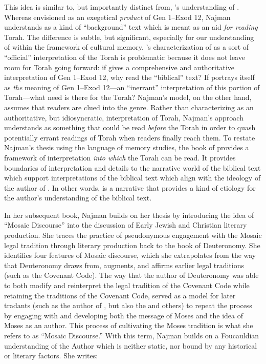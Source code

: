 This idea is similar to, but importantly distinct from, \vanderkam's understanding of \jub. Whereas \vanderkam envisioned \jub as an exegetical \emph{product} of Gen 1--Exod 12, Najman understands \jub as a kind of ``background'' text which is meant as an aid \emph{for reading} Torah. The difference is subtle, but significant, especially for our understanding of \jub within the framework of cultural memory. \vanderkam's characterization of \jub as a sort of ``official'' interpretation of the Torah is problematic because it does not leave room for Torah going forward: if \jub gives a comprehensive and authoritative interpretation of Gen 1--Exod 12, why read the ``biblical'' text? If \jub portrays itself as \emph{the} meaning of Gen 1--Exod 12---an ``inerrant'' interpretation of this portion of Torah---what need is there for the Torah? Najman's model, on the other hand, assumes that readers are clued into the genre. Rather than  characterizing \jub as an authoritative, but idiosyncratic, interpretation of Torah, Najman's approach understands \jub as something that could be read \emph{before} the Torah in order to quash potentially errant readings of Torah when readers finally reach them.%
    \autocite[408]{najman_jsj1999} 
To restate Najman's thesis using the language of memory studies, the book of \jub provides a framework of interpretation \emph{into which} the Torah can be read. It provides boundaries of interpretation and details to the narrative world of the biblical text which support interpretations of the biblical text which align with the ideology of the author of \jub. In other words, \jub is a narrative that provides a kind of etiology for the author's understanding of the biblical text. 

In her subsequent book, Najman builds on her thesis by introducing the idea of ``Mosaic Discourse'' into the discussion of Early Jewish and Christian literary production. She traces the practice of pseudonymous engagement with the Mosaic legal tradition through literary production back to the book of Deuteronomy.\autocite[48]{najman2003} She identifies four features of Mosaic discourse, which she extrapolates from the way that Deuteronomy draws from, augments, and affirms earlier legal traditions (such as the Covenant Code). The way that the author of Deuteronomy was able to both modify and reinterpret the legal tradition of the Covenant Code while retaining the traditions of the Covenant Code, served as a model for later tradants (such as the author of \jub, but also the \templescroll and others) to repeat the process by engaging with and developing both the message of Moses and the idea of Moses as an author. This process of cultivating the Moses tradition is what she refers to as ``Mosaic Discourse.'' With this term, Najman builds on a Foucauldian understanding of the Author which is neither static, nor bound by any historical or literary factors. She writes:

